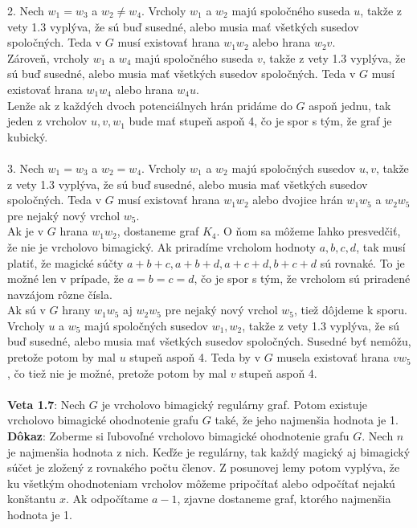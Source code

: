 \documentclass[12pt]{article}
\begin{document}
2. Nech $w_1 = w_3$ a $w_2 \neq w_4$. Vrcholy $w_1$ a $w_2$ majú spoločného suseda $u$, takže z vety 1.3 vyplýva, že sú buď susedné, alebo musia mať všetkých susedov spoločných. Teda v $G$ musí existovať hrana $w_1 w_2$ alebo hrana $w_2 v$. \\

Zároveň, vrcholy $w_1$ a $w_4$ majú spoločného suseda $v$, takže z vety 1.3 vyplýva, že sú buď susedné, alebo musia mať všetkých susedov spoločných. Teda v $G$ musí existovať hrana $w_1 w_4$ alebo hrana $w_4 u$. \\

Lenže ak z každých dvoch potenciálnych hrán pridáme do $G$ aspoň jednu, tak jeden z vrcholov $u, v, w_1$ bude mať stupeň aspoň 4, čo je spor s tým, že graf je kubický. \\\\

3. Nech $w_1 = w_3$ a $w_2 = w_4$. Vrcholy $w_1$ a $w_2$ majú spoločných susedov $u,v$, takže z vety 1.3 vyplýva, že sú buď susedné, alebo musia mať všetkých susedov spoločných. Teda v $G$ musí existovať hrana $w_1 w_2$ alebo dvojice hrán $w_1 w_5$ a $w_2 w_5$ pre nejaký nový vrchol $w_5$. \\

Ak je v $G$ hrana $w_1 w_2$, dostaneme graf $K_4$. O ňom sa môžeme ľahko presvedčiť, že nie je vrcholovo bimagický. Ak priradíme vrcholom hodnoty $a,b,c,d$, tak musí platiť, že magické súčty $a+b+c, a+b+d, a+c+d, b+c+d$ sú rovnaké. To je možné len v prípade, že $a = b = c = d$, čo je spor s tým, že vrcholom sú priradené navzájom rôzne čísla. \\

Ak sú v $G$ hrany $w_1 w_5$ aj $w_2 w_5$ pre nejaký nový vrchol $w_5$, tiež dôjdeme k sporu. Vrcholy $u$ a $w_5$ majú spoločných susedov $w_1, w_2$, takže z vety 1.3 vyplýva, že sú buď susedné, alebo musia mať všetkých susedov spoločných. Susedné byť nemôžu, pretože potom by mal $u$ stupeň aspoň 4. Teda by v $G$ musela existovať hrana $v w_5$, čo tiež nie je možné, pretože potom by mal $v$ stupeň aspoň 4. \\\\

\textbf{Veta 1.7}: Nech $G$ je vrcholovo bimagický regulárny graf. Potom existuje vrcholovo bimagické ohodnotenie grafu $G$ také, že jeho najmenšia hodnota je 1. \\

\textbf{Dôkaz}: Zoberme si ľubovoľné vrcholovo bimagické ohodnotenie grafu $G$. Nech $n$ je najmenšia hodnota z nich. Keďže je regulárny, tak každý magický aj bimagický súčet je zložený z rovnakého počtu členov. Z posunovej lemy potom vyplýva, že ku všetkým ohodnoteniam vrcholov môžeme pripočítať alebo odpočítať nejakú konštantu $x$. Ak odpočítame $a-1$, zjavne dostaneme graf, ktorého najmenšia hodnota je 1. \\\\
\end{document}
